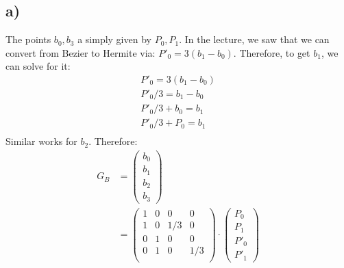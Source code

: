 \documentclass[a4paper]{scrartcl}
\begin{document}
  \subsection*{a)}
    The points $b_0, b_3$ a simply given by $P_0, P_1$. In the lecture, we saw
    that we can convert from Bezier to Hermite via: $P'_0=3(b_1-b_0)$.
    Therefore, to get $b_1$, we can solve for it:
    \begin{align*}
      P'_0=3(b_1-b_0)\\
      P'_0/3=b_1-b_0\\
      P'_0/3 + b_0 =b_1\\
      P'_0/3 + P_0 =b_1\\
    \end{align*}
    Similar works for $b_2$.
    Therefore: 
      \begin{align*}
        G_B
        &= \begin{pmatrix}
          b_0\\b_1\\b_2\\b_3
        \end{pmatrix}\\
        &= \begin{pmatrix}
          1 & 0 & 0 & 0\\
          1 & 0 & 1/3 & 0\\
          0 & 1 & 0 & 0\\
          0 & 1 & 0 & 1/3\\
        \end{pmatrix}
        \cdot \begin{pmatrix}
          P_0\\P_1\\P'_0\\P'_1
        \end{pmatrix}
      \end{align*}
\end{document}
